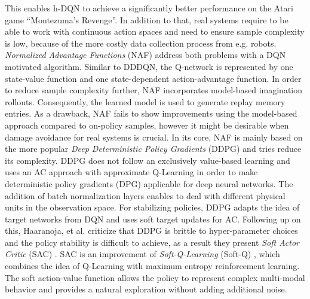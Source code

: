 	This enables h-DQN to achieve a significantly better performance on the Atari game ``Montezuma's Revenge''.
	In addition to that, real systems require to be able to work with continuous action spaces and need to ensure sample complexity is low, because of the more costly data collection process from e.g. robots.
	\textit{Normalized Advantage Functions} (NAF) \cite{Gu2016} address both problems with a DQN motivated algorithm.
	Similar to DDDQN, the Q-network is represented by one state-value function and one state-dependent action-advantage function.
	In order to reduce sample complexity further, NAF incorporates model-based imagination rollouts. 
	Consequently, the learned model is used to generate replay memory entries. 
	As a drawback, NAF fails to show improvements using the model-based approach compared to on-policy samples, however it might be desirable when damage avoidance for real systems is crucial.
	In its core, NAF is mainly based on the more popular \textit{Deep Deterministic Policy Gradients} (DDPG) \cite{Lillicrap2016} and tries reduce its complexity.
	DDPG does not follow an exclusively value-based learning and uses an AC approach with approximate Q-Learning in order to make deterministic policy gradients (DPG) \cite{Silver2014} applicable for deep neural networks.
	The addition of batch normalization layers \cite{Ioffe2015} enables to deal with different physical units in the observation space. 
	For stabilizing policies, DDPG adapts the idea of target networks from DQN and uses soft target updates for AC. 
	Following up on this, Haaranoja, et al. criticize that DDPG is brittle to hyper-parameter choices and the policy stability is difficult to achieve, as a result they present \textit{Soft Actor Critic} (SAC) \cite{Haarnoja2018}.
	SAC is an improvement of \textit{Soft-Q-Learning} (Soft-Q) \cite{Haarnoja2017}, which combines the idea of Q-Learning with maximum entropy reinforcement learning.
	The soft action-value function allows the policy to represent complex multi-modal behavior and provides a natural exploration without adding additional noise.
